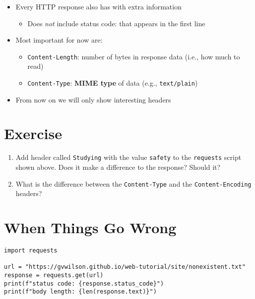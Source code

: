 \documentclass[krantzl]{krantz}
\newcommand{\glossref}[1]{\textbf{#1}}
\begin{document}
\begin{itemize}
\item Every HTTP response also has with extra information\begin{itemize}
\item Does \emph{not} include status code: that appears in the first line

\end{itemize}


\item Most important for now are:\begin{itemize}
\item \texttt{Content-Length}: number of bytes in response data (i.e., how much to read)

\item \texttt{Content-Type}: \glossref{MIME type} of data (e.g., \texttt{text/plain})

\end{itemize}


\item From now on we will only show interesting headers

\end{itemize}
\section{Exercise}
\begin{enumerate}
\item 

Add header called \texttt{Studying} with the value \texttt{safety}
    to the \texttt{requests} script shown above.
    Does it make a difference to the response?
    Should it?



\item 

What is the difference between the \texttt{Content-Type} and the \texttt{Content-Encoding} headers?



\end{enumerate}
\section{When Things Go Wrong}
\begin{lstlisting}[frame=tblr]
import requests

url = "https://gvwilson.github.io/web-tutorial/site/nonexistent.txt"
response = requests.get(url)
print(f"status code: {response.status_code}")
print(f"body length: {len(response.text)}")
\end{lstlisting}
\end{document}

